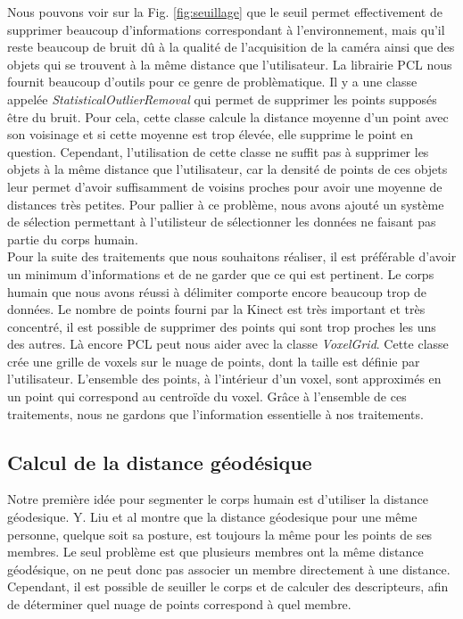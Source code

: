 Nous pouvons voir sur la Fig. \ref{fig:seuillage} que le seuil permet effectivement de supprimer beaucoup d'informations
correspondant à l'environnement, mais qu'il reste beaucoup de bruit dû à la qualité de l'acquisition de la caméra ainsi que 
des objets qui se trouvent à la même distance que l'utilisateur. La librairie
PCL\cite{PCL} nous fournit beaucoup d'outils pour ce genre de problèmatique. Il y a une classe appelée \textit{StatisticalOutlierRemoval}
qui permet de supprimer les points supposés être du bruit. Pour cela, cette classe calcule la distance moyenne d'un point avec son
voisinage et si cette moyenne est trop élevée, elle supprime le point en question. Cependant, l'utilisation de cette classe ne
suffit pas à supprimer les objets à la même distance que l'utilisateur, car la densité de points de ces objets leur permet d'avoir
suffisamment de voisins proches pour avoir une moyenne de distances très petites. Pour pallier à ce problème, nous avons ajouté un
système de sélection permettant à l'utilisteur de sélectionner les données ne faisant pas partie du corps humain.\\

Pour la suite des traitements que nous souhaitons réaliser, il est préférable d'avoir un minimum d'informations et de ne garder
que ce qui est pertinent. Le corps humain que nous avons réussi à délimiter comporte encore beaucoup trop de données. Le nombre
de points fourni par la Kinect est très important et très concentré, il est possible de supprimer des points qui sont trop 
proches les uns des autres. Là encore PCL\cite{PCL} peut nous aider avec la classe \textit{VoxelGrid}. Cette classe crée une grille de
voxels sur le nuage de points, dont la taille est définie par l'utilisateur. L'ensemble des points, à l'intérieur d'un voxel, sont 
approximés en un point qui correspond au centroïde du voxel. Grâce à l'ensemble de ces traitements, nous ne gardons que l'information 
essentielle à nos traitements.

\subsection{Calcul de la distance géodésique}
Notre première idée pour segmenter le corps humain est d'utiliser la distance géodesique. Y. Liu et al\cite{GIF} montre que la distance
géodesique pour une même personne, quelque soit sa posture, est toujours la même pour les points de ses membres. Le seul problème 
est que plusieurs membres ont la même distance géodésique, on ne peut donc pas associer un membre directement à une distance.
Cependant, il est possible de seuiller le corps et de calculer des descripteurs, afin de déterminer quel nuage de points
correspond à quel membre.\\

